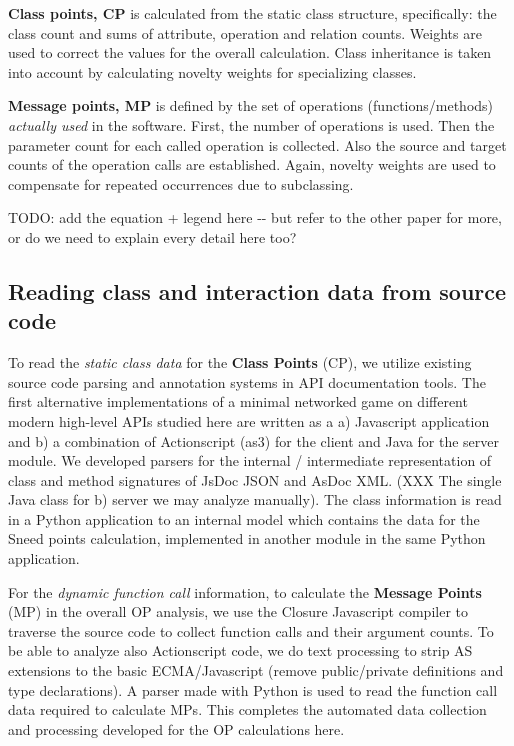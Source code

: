 \documentclass[conference]{IEEEtran}
\begin{document}
\textbf{Class points, CP} is calculated from the static class structure,
specifically: the class count and sums of attribute, operation and
relation counts. Weights are used to correct the values for the
overall calculation. Class inheritance is taken into account by
calculating novelty weights for specializing classes.

\textbf{Message points, MP} is defined by the set of operations
(functions/methods) \emph{actually used} in the software. First, the number
of operations is used. Then the parameter count for each called
operation is collected. Also the source and target counts of the
operation calls are established. Again, novelty weights are used to
compensate for repeated occurrences due to subclassing.

TODO: add the equation + legend here -{}- but refer to the other paper
for more, or do we need to explain every detail here too?


\subsection{Reading class and interaction data from source code%
  \label{reading-class-and-interaction-data-from-source-code}%
}

To read the \emph{static class data} for the \textbf{Class Points} (CP), we
utilize existing source code parsing and annotation systems in API
documentation tools. The first alternative implementations of a
minimal networked game on different modern high-level APIs studied
here are written as a a) Javascript application and b) a combination
of Actionscript (as3) for the client and Java for the server
module. We developed parsers for the internal / intermediate
representation of class and method signatures of JsDoc JSON and
AsDoc XML. (XXX The single Java class for b) server we may analyze
manually). The class information is read in a Python application to an
internal model which contains the data for the Sneed points
calculation, implemented in another module in the same Python
application.

For the \emph{dynamic function call} information, to calculate the
\textbf{Message Points} (MP) in the overall OP analysis, we use the Closure
Javascript compiler to traverse the source code to collect function
calls and their argument counts. To be able to analyze also
Actionscript code, we do text processing to strip AS extensions to the
basic ECMA/Javascript (remove public/private definitions and type
declarations). A parser made with Python is used to read the function
call data required to calculate MPs. This completes the automated data
collection and processing developed for the OP calculations here.
\end{document}
